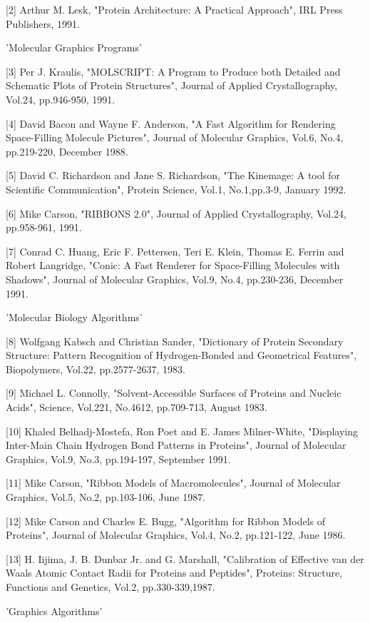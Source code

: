 [2] Arthur M. Lesk, "Protein Architecture: A Practical Approach", IRL
Press Publishers, 1991.

'Molecular Graphics Programs'

[3] Per J. Kraulis, "MOLSCRIPT: A Program to Produce both Detailed and
Schematic Plots of Protein Structures", Journal of Applied
Crystallography, Vol.24, pp.946-950, 1991.

[4] David Bacon and Wayne F. Anderson, "A Fast Algorithm for Rendering
Space-Filling Molecule Pictures", Journal of Molecular Graphics, Vol.6,
No.4, pp.219-220, December 1988.

[5] David C. Richardson and Jane S. Richardson, "The Kinemage: A tool
for Scientific Communication", Protein Science, Vol.1, No.1,pp.3-9,
January 1992.

[6] Mike Carson, "RIBBONS 2.0", Journal of Applied Crystallography,
Vol.24, pp.958-961, 1991.

[7] Conrad C. Huang, Eric F. Pettersen, Teri E. Klein, Thomas E.
Ferrin and Robert Langridge, "Conic: A Fast Renderer for
Space-Filling Molecules with Shadows", Journal of Molecular Graphics,
Vol.9, No.4, pp.230-236, December 1991.

'Molecular Biology Algorithms'

[8] Wolfgang Kabsch and Christian Sander, "Dictionary of Protein
Secondary Structure: Pattern Recognition of Hydrogen-Bonded and
Geometrical Features", Biopolymers, Vol.22, pp.2577-2637, 1983.

[9] Michael L. Connolly, "Solvent-Accessible Surfaces of Proteins and Nucleic
Acids", Science, Vol.221, No.4612, pp.709-713, August 1983.

[10] Khaled Belhadj-Mostefa, Ron Poet and E. James Milner-White,
"Displaying Inter-Main Chain Hydrogen Bond Patterns in Proteins",
Journal of Molecular Graphics, Vol.9, No.3, pp.194-197, September 1991.

[11] Mike Carson, "Ribbon Models of Macromolecules", Journal of
Molecular Graphics, Vol.5, No.2, pp.103-106, June 1987.

[12] Mike Carson and Charles E. Bugg, "Algorithm for Ribbon Models of
Proteins", Journal of Molecular Graphics, Vol.4, No.2, pp.121-122, June
1986.

[13] H. Iijima, J. B. Dunbar Jr. and G. Marshall, "Calibration of
Effective van der Waals Atomic Contact Radii for Proteins and
Peptides", Proteins: Structure, Functions and Genetics, Vol.2,
pp.330-339,1987.

'Graphics Algorithms'

